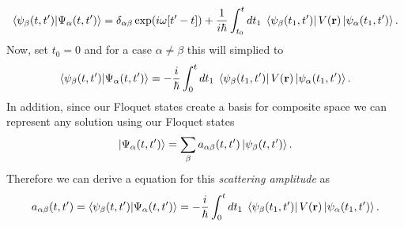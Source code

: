 \begin{equation} \label{4.15}
  \begin{aligned}
    \braket{\psi_{\beta}(t,t')}{\Psi_{\alpha}(t,t')} =
    \delta_{\alpha\beta}\exp(i\omega\qty[t'-t]) +
    \frac{1}{i\hbar}
    \int_{t_0}^t dt_1 \;
    \bra{\psi_{\beta}(t_1,t')}
    V(\mathbf{r}) \ket{\psi_{\alpha}(t_1,t')}.
  \end{aligned}
\end{equation}
Now, set $t_0 = 0$ and for a case $\alpha \neq \beta$ this will simplied to
\begin{equation} \label{4.16}
  \begin{aligned}
    \braket{\psi_{\beta}(t,t')}{\Psi_{\alpha}(t,t')} =
    -
    \frac{i}{\hbar}
    \int_{0}^t dt_1 \;
    \bra{\psi_{\beta}(t_1,t')}
    V(\mathbf{r}) \ket{\psi_{\alpha}(t_1,t')}.
  \end{aligned}
\end{equation}
In addition, since our Floquet states create a basis for composite space we can represent any solution using our Floquet states
\begin{equation} \label{4.17}
  \ket{\Psi_{\alpha}(t,t')} = \sum_{\beta} a_{\alpha\beta}(t,t')
  \ket{\psi_{\beta}(t,t')}.
\end{equation}
Therefore we can derive a equation for this \textit{scattering amplitude} as
\begin{equation} \label{4.18}
  a_{\alpha\beta}(t,t') =
  \braket{\psi_{\beta}(t,t')}{\Psi_{\alpha}(t,t')} =
  -
  \frac{i}{\hbar}
  \int_{0}^t dt_1 \;
  \bra{\psi_{\beta}(t_1,t')}
  V(\mathbf{r}) \ket{\psi_{\alpha}(t_1,t')}.
\end{equation}

